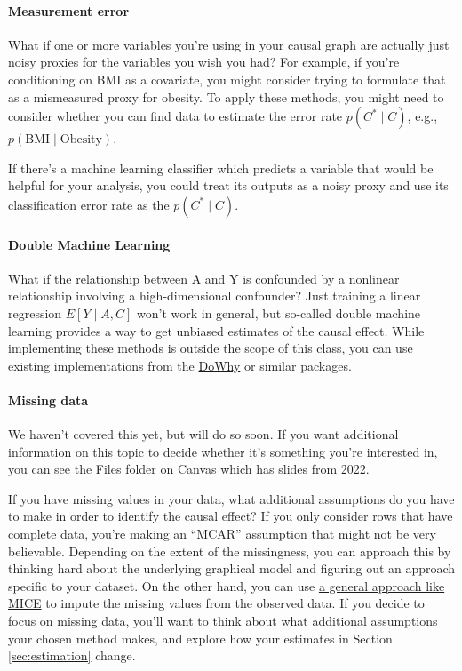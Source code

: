 \documentclass[12pt]{article}
\begin{document}
\paragraph{Measurement error}

What if one or more variables you're using in your causal graph are actually
just noisy proxies for the variables you wish you had? For example, if you're
conditioning on BMI as a covariate, you might consider trying to formulate that
as a mismeasured proxy for obesity. To apply these methods, you might need
to consider whether you can find data to estimate the error rate $p(C^* \mid C)$,
e.g., $p(\text{BMI} \mid \text{Obesity})$.

If there's a machine learning classifier which predicts a variable that would
be helpful for your analysis, you could treat its outputs as a noisy proxy
and use its classification error rate as the $p(C^* \mid C)$.

\paragraph{Double Machine Learning}

What if the relationship between A and Y is confounded by a nonlinear
relationship involving a high-dimensional confounder? Just training a linear
regression $E[Y \mid A, C]$ won't work in general, but so-called double machine
learning provides a way to get unbiased estimates of the causal effect. While
implementing these methods is outside the scope of this class, you can use
existing implementations from the
\href{https://microsoft.github.io/dowhy/}{DoWhy} or similar packages.

\paragraph{Missing data}

We haven't covered this yet, but will do so soon. If you want additional
information on this topic to decide whether it's something you're interested
in, you can see the Files folder on Canvas which has slides from 2022.

If you have missing values in your data, what additional assumptions do you
have to make in order to identify the causal effect? If you only consider rows
that have complete data, you're making an ``MCAR'' assumption that might not be
very believable. Depending on the extent of the missingness, you can approach
this by thinking hard about the underlying graphical model and figuring out an
approach specific to your dataset. On the other hand, you can use
\href{https://github.com/kshedden/mice_workshop}{a general approach like MICE}
to impute the missing values from the observed data. If you decide to focus on
missing data, you'll want to think about what additional assumptions your
chosen method makes, and explore how your estimates in Section
\ref{sec:estimation} change.
\end{document}
